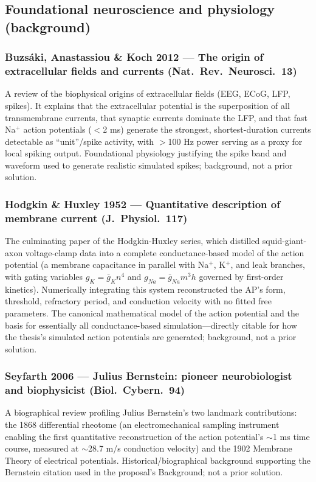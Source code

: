 \documentclass[11pt]{article}
\begin{document}
\subsection*{Foundational neuroscience and physiology (background)}

\subsubsection*{Buzs\'aki, Anastassiou \& Koch 2012 --- The origin of extracellular fields and currents (Nat.\ Rev.\ Neurosci.\ 13)}
A review of the biophysical origins of extracellular fields (EEG, ECoG, LFP, spikes). It explains that the extracellular potential is the superposition of all transmembrane currents, that synaptic currents dominate the LFP, and that fast Na$^+$ action potentials ($<$2 ms) generate the strongest, shortest-duration currents detectable as ``unit''/spike activity, with $>$100 Hz power serving as a proxy for local spiking output. Foundational physiology justifying the spike band and waveform used to generate realistic simulated spikes; background, not a prior solution.

\subsubsection*{Hodgkin \& Huxley 1952 --- Quantitative description of membrane current (J.\ Physiol.\ 117)}
The culminating paper of the Hodgkin-Huxley series, which distilled squid-giant-axon voltage-clamp data into a complete conductance-based model of the action potential (a membrane capacitance in parallel with Na$^+$, K$^+$, and leak branches, with gating variables $g_K=\bar g_K n^4$ and $g_{Na}=\bar g_{Na} m^3 h$ governed by first-order kinetics). Numerically integrating this system reconstructed the AP's form, threshold, refractory period, and conduction velocity with no fitted free parameters. The canonical mathematical model of the action potential and the basis for essentially all conductance-based simulation---directly citable for how the thesis's simulated action potentials are generated; background, not a prior solution.

\subsubsection*{Seyfarth 2006 --- Julius Bernstein: pioneer neurobiologist and biophysicist (Biol.\ Cybern.\ 94)}
A biographical review profiling Julius Bernstein's two landmark contributions: the 1868 differential rheotome (an electromechanical sampling instrument enabling the first quantitative reconstruction of the action potential's $\sim$1 ms time course, measured at $\sim$28.7 m/s conduction velocity) and the 1902 Membrane Theory of electrical potentials. Historical/biographical background supporting the Bernstein citation used in the proposal's Background; not a prior solution.
\end{document}
